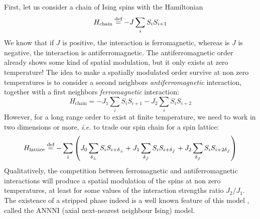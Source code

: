 First, let us consider a chain of Ising spins with the Hamiltonian
\begin{equation}
H_{\text{chain}}  \overset{\text{def}}{=}  - J \sum_i S_i S_{i+1}
\end{equation}
We know that if $J$ is positive, the interaction is ferromagnetic, whereas is $J$ is negative, the interaction is antiferromagnetic. 
The antiferromagnetic order already shows some kind of spatial modulation, but it only exists at zero temperature! 
The idea to make a spatially modulated order survive at non zero temperatures is to consider a second neighbors \textit{antiferromagnetic} interaction, together with a first neighbors \textit{ferromagnetic} interaction:
\begin{equation}
H_{\text{chain}} = - J_1 \sum_i S_i S_{i+1} - J_2 \sum_i S_i S_{i+2}
\end{equation}
However, for a long range order to exist at finite temperature, we need to work in two dimensions or more, \textit{i.e.} to trade our spin chain for a spin lattice:
 \begin{equation}
 H_{\text{lattice}}  \overset{\text{def}}{=}  - \sum_i \left( J_0 \sum_{\delta_\perp} S_i S_{i+\delta_\perp} + J_1 \sum_{\delta_\sslash} S_i S_{i+\delta_\sslash} + J_2 \sum_{\delta_\sslash} S_i S_{i+2 \delta_\sslash} \right)
 \end{equation}
 Qualitatively, the competition between ferromagnetic and antiferromagnetic interactions will produce a spatial modulation of the spins at non zero temperatures, at least for some values of the interaction strengths ratio $J_2/J_1$. 
 The existence of a stripped phase indeed is a well known feature of this model \cite{ANNNI}, called the ANNNI (axial next-nearest neighbour Ising) model.
 
